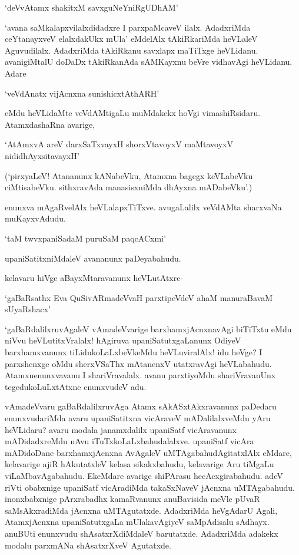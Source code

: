 \begin{shloka}
`deVvAtamx shakitxM savxguNeYniRgUDhAM'
\end{shloka}

`avana saMkalapxvilalxdidadxre I parxpaMcaveV ilalx. AdadxriMda ceYtanayxveV elalxdakUkx mUla' eMdelAlx tAkiRkariMda heVLaleV Aguvudilalx. AdadxriMda tAkiRkanu savxlapx maTiTxge heVLidanu. avanigiMtalU doDaDx tAkiRkanAda sAMKayxnu beVre vidhavAgi heVLidanu. Adare

\begin{shloka}
`veVdAnatx vijAcnxna sunishicxtAthARH'
\end{shloka}

eMdu heVLidaMte veVdAMtigaLu muMdakekx hoVgi vimashiRsidaru. AtamxdashaRna avarige,

\begin{shloka}
`AtAmxvA areV darxSaTxvayxH shorxVtavoyxV maMtavoyxV nididhAyxsitavayxH'
\end{shloka}

(`pirxyaLeV! Atananunx kANabeVku, Atamxna bagegx keVLabeVku ciMtisabeVku. sithxravAda manasisxniMda dhAyxna mADabeVku'.)

enunxva mAgaRvelAlx heVLalapxTiTxve. avugaLalilx veVdAMta sharxvaNa muKayxvAdudu.

\begin{shloka}
`taM twvxpaniSadaM puruSaM paqcACxmi'
\end{shloka}

upaniSatitxniMdaleV avananunx paDeyabahudu.

kelavaru hiVge aBayxMtaravanunx heVLutAtxre-

\begin{shloka}
`gaBaRsathx Eva QuSivARmadeVvaH parxtipeVdeV ahaM manuraBavaM sUyaRshacx'
\end{shloka}

`gaBaRdalilxruvAgaleV vAmadeVvarige barxhamxjAcnxnavAgi biTiTxtu eMdu niVvu heVLutitxVralalx! hAgiruva upaniSatutxgaLanunx OdiyeV barxhamxvanunx tiLidukoLaLxbeVkeMdu heVLuviralAlx! idu heVge? I parxshenxge oMdu sherxVSaThx mAtanenxV utatxravAgi heVLabahudu. Atamxnenunxvavanu I shariVravalalx. avanu parxtiyoMdu shariVravanUnx tegedukoLuLxtAtxne enunxvudeV adu.

vAmadeVvaru gaBaRdalilxruvAga Atamx sAkASxtAkxravanunx paDedaru enunxvudariMda avaru upaniSatitxna vicAraveV mADalilalxveMdu yAru heVLidaru? avaru modala janamxdalilx upaniSatf vicAravanunx mADidadxreMdu nAvu iTuTxkoLaLxbahudalalxve. upaniSatf vicAra mADidoDane barxhamxjAcnxna AvAgaleV uMTAgabahudAgitatxlAlx eMdare, kelavarige ajiR hAkutatxleV kelasa sikakxbahudu, kelavarige Aru tiMgaLu viLaMbavAgabahudu. EkeMdare avarige shiPArasu hecAcxgirabahudu. adeV riVti obabxnige upaniSatf vicAradiMda takaSxNaveV jAcnxna uMTAgabahudu. inonxbabxnige pArxrabadhx kamaRvanunx anuBavisida meVle pUvaR saMsAkxradiMda jAcnxna uMTAgutatxde. AdadxriMda heVgAdarU Agali, AtamxjAcnxna upaniSatutxgaLa mUlakavAgiyeV saMpAdisalu sAdhayx. anuBUti enunxvudu shAsatxrXdiMdaleV barutatxde. AdadxriMda adakekx modalu parxmANa shAsatxrXveV Agutatxde.

